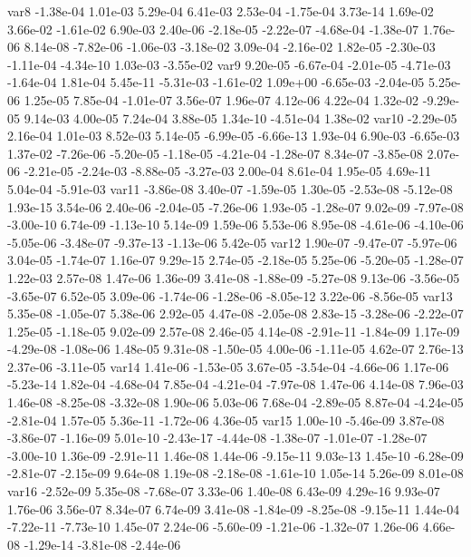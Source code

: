 var8 -1.38e-04  1.01e-03  5.29e-04  6.41e-03  2.53e-04 -1.75e-04  3.73e-14  1.69e-02  3.66e-02 -1.61e-02  6.90e-03  2.40e-06 -2.18e-05 -2.22e-07 -4.68e-04 -1.38e-07  1.76e-06  8.14e-08 -7.82e-06 -1.06e-03 -3.18e-02  3.09e-04 -2.16e-02  1.82e-05 -2.30e-03 -1.11e-04 -4.34e-10  1.03e-03 -3.55e-02
var9  9.20e-05 -6.67e-04 -2.01e-05 -4.71e-03 -1.64e-04  1.81e-04  5.45e-11 -5.31e-03 -1.61e-02  1.09e+00 -6.65e-03 -2.04e-05  5.25e-06  1.25e-05  7.85e-04 -1.01e-07  3.56e-07  1.96e-07  4.12e-06  4.22e-04  1.32e-02 -9.29e-05  9.14e-03  4.00e-05  7.24e-04  3.88e-05  1.34e-10 -4.51e-04  1.38e-02
var10 -2.29e-05  2.16e-04  1.01e-03  8.52e-03  5.14e-05 -6.99e-05 -6.66e-13  1.93e-04  6.90e-03 -6.65e-03  1.37e-02 -7.26e-06 -5.20e-05 -1.18e-05 -4.21e-04 -1.28e-07  8.34e-07 -3.85e-08  2.07e-06 -2.21e-05 -2.24e-03 -8.88e-05 -3.27e-03  2.00e-04  8.61e-04  1.95e-05  4.69e-11  5.04e-04 -5.91e-03
var11 -3.86e-08  3.40e-07 -1.59e-05  1.30e-05 -2.53e-08 -5.12e-08  1.93e-15  3.54e-06  2.40e-06 -2.04e-05 -7.26e-06  1.93e-05 -1.28e-07  9.02e-09 -7.97e-08 -3.00e-10  6.74e-09 -1.13e-10  5.14e-09  1.59e-06  5.53e-06  8.95e-08 -4.61e-06 -4.10e-06 -5.05e-06 -3.48e-07 -9.37e-13 -1.13e-06  5.42e-05
var12  1.90e-07 -9.47e-07 -5.97e-06  3.04e-05 -1.74e-07  1.16e-07  9.29e-15  2.74e-05 -2.18e-05  5.25e-06 -5.20e-05 -1.28e-07  1.22e-03  2.57e-08  1.47e-06  1.36e-09  3.41e-08 -1.88e-09 -5.27e-08  9.13e-06 -3.56e-05 -3.65e-07  6.52e-05  3.09e-06 -1.74e-06 -1.28e-06 -8.05e-12  3.22e-06 -8.56e-05
var13  5.35e-08 -1.05e-07  5.38e-06  2.92e-05  4.47e-08 -2.05e-08  2.83e-15 -3.28e-06 -2.22e-07  1.25e-05 -1.18e-05  9.02e-09  2.57e-08  2.46e-05  4.14e-08 -2.91e-11 -1.84e-09  1.17e-09 -4.29e-08 -1.08e-06  1.48e-05  9.31e-08 -1.50e-05  4.00e-06 -1.11e-05  4.62e-07  2.76e-13  2.37e-06 -3.11e-05
var14  1.41e-06 -1.53e-05  3.67e-05 -3.54e-04 -4.66e-06  1.17e-06 -5.23e-14  1.82e-04 -4.68e-04  7.85e-04 -4.21e-04 -7.97e-08  1.47e-06  4.14e-08  7.96e-03  1.46e-08 -8.25e-08 -3.32e-08  1.90e-06  5.03e-06  7.68e-04 -2.89e-05  8.87e-04 -4.24e-05 -2.81e-04  1.57e-05  5.36e-11 -1.72e-06  4.36e-05
var15  1.00e-10 -5.46e-09  3.87e-08 -3.86e-07 -1.16e-09  5.01e-10 -2.43e-17 -4.44e-08 -1.38e-07 -1.01e-07 -1.28e-07 -3.00e-10  1.36e-09 -2.91e-11  1.46e-08  1.44e-06 -9.15e-11  9.03e-13  1.45e-10 -6.28e-09 -2.81e-07 -2.15e-09  9.64e-08  1.19e-08 -2.18e-08 -1.61e-10  1.05e-14  5.26e-09  8.01e-08
var16 -2.52e-09  5.35e-08 -7.68e-07  3.33e-06  1.40e-08  6.43e-09  4.29e-16  9.93e-07  1.76e-06  3.56e-07  8.34e-07  6.74e-09  3.41e-08 -1.84e-09 -8.25e-08 -9.15e-11  1.44e-04 -7.22e-11 -7.73e-10  1.45e-07  2.24e-06 -5.60e-09 -1.21e-06 -1.32e-07  1.26e-06  4.66e-08 -1.29e-14 -3.81e-08 -2.44e-06
